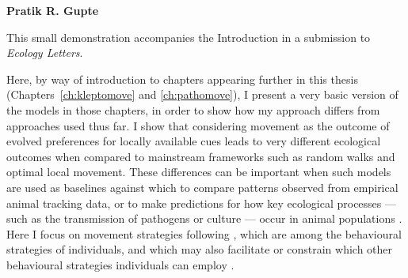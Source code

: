 
\pagestyle{plain}

\begingroup

\let\clearpage\relax
\let\cleardoublepage\relax
\let\cleardoublepage\relax

\begin{interludeenv}

\renewcommand\thefigure{\theinterludes-\arabic{figure}}
\setcounter{figure}{0}

\label{box:demos}

\noindent \textbf{Pratik R. Gupte}

\medskip

\noindent {\large{$\Delta$}} {\footnotesize This small demonstration accompanies the Introduction in a submission to \emph{Ecology Letters}.}

\medskip

Here, by way of introduction to chapters appearing further in this thesis (Chapters~\ref{ch:kleptomove} and \ref{ch:pathomove}), I present a very basic version of the models in those chapters, in order to show how my approach differs from approaches used thus far.
I show that considering movement as the outcome of evolved preferences for locally available cues leads to very different ecological outcomes when compared to mainstream frameworks such as random walks and optimal local movement.
These differences can be important when such models are used as baselines against which to compare patterns observed from empirical animal tracking data, or to make predictions for how key ecological processes --- such as the transmission of pathogens or culture --- occur in animal populations \parencite{cantor2021}.
Here I focus on movement strategies following \textcite{bastille-rousseau2019}, which are among the behavioural strategies of individuals, and which may also facilitate or constrain which other behavioural strategies individuals can employ \citep{nathan2008a,spiegel2017}.


\end{interludeenv}
